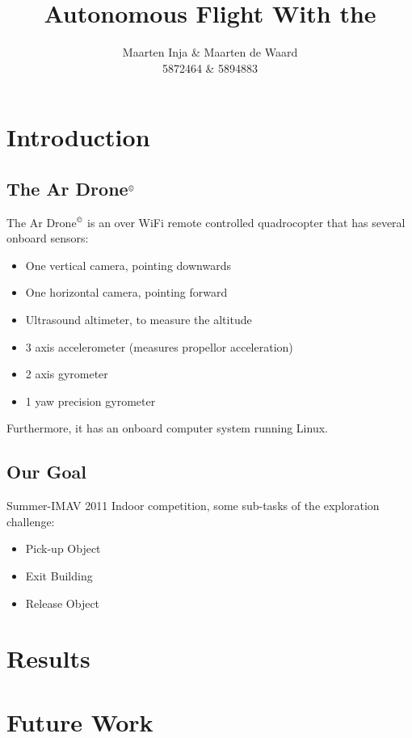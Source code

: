 \documentclass[a4paper,10pt]{article}
\title{Autonomous Flight With the \Ardrone}
\author{Maarten Inja \& Maarten de Waard\\\small 5872464 \& 5894883}
\newcommand{\Ardrone}{Ar Drone$^{\copyright}$ }
\begin{document}
\maketitle

\section{Introduction}

\subsection{The \Ardrone}
The \Ardrone is an over WiFi remote controlled quadrocopter that has several onboard sensors:
\begin{itemize}
	\item One vertical camera, pointing downwards
	\item One horizontal camera, pointing forward 
	\item Ultrasound altimeter, to measure the altitude
    \item 3 axis accelerometer (measures propellor acceleration)
    \item 2 axis gyrometer 
    \item 1 yaw precision gyrometer
\end{itemize}
Furthermore, it has an onboard computer system running Linux. 


\subsection{Our Goal}
Summer-IMAV 2011 Indoor competition, some sub-tasks of the exploration challenge:
\begin{itemize}
    \item Pick-up Object
    \item Exit Building
    \item Release Object
\end{itemize}








\section{Results}

\section{Future Work}
\end{document}
